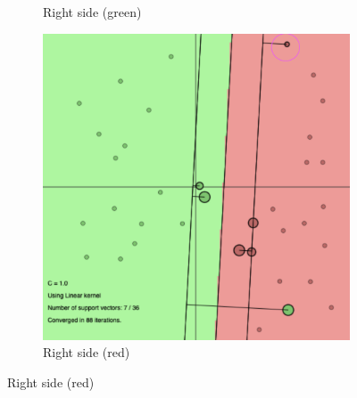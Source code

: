 \documentclass[a4paper, 11pt, one column]{article}
\begin{document}
\begin{figure}[]
\begin{subfigure}{0.33\linewidth}
            \caption{Right side (green)}
        \end{subfigure}
        \begin{subfigure}{0.33\linewidth}
            \includegraphics[width=\linewidth]{images/lin_right_red.png}
            \caption{Right side (red)}
        \end{subfigure}


\end{figure}
\end{document}
